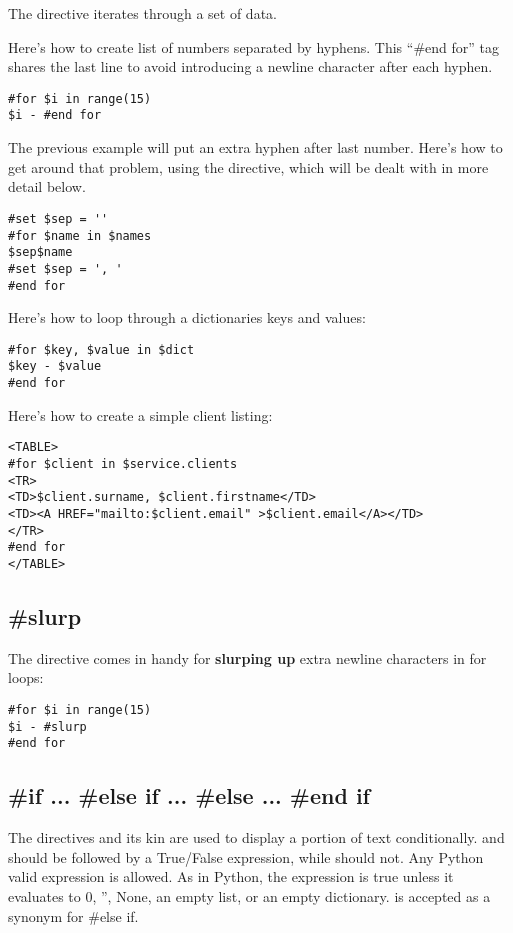 The  directive iterates through a set of data.

Here's how to create list of numbers separated by hyphens. This ``\#end for''
tag shares the last line to avoid introducing a newline character after each
hyphen.  
\begin{verbatim}
#for $i in range(15)
$i - #end for
\end{verbatim}

The previous example will put an extra hyphen after last number.  Here's how to
get around that problem, using the  directive, which will be dealt
with in more detail below.
\begin{verbatim}
#set $sep = '' 
#for $name in $names 
$sep$name 
#set $sep = ', ' 
#end for 
\end{verbatim}

Here's how to loop through a dictionaries keys and values:
\begin{verbatim}
#for $key, $value in $dict
$key - $value
#end for
\end{verbatim}

Here's how to create a simple client listing:
\begin{verbatim}
<TABLE>
#for $client in $service.clients
<TR>
<TD>$client.surname, $client.firstname</TD>
<TD><A HREF="mailto:$client.email" >$client.email</A></TD>
</TR>
#end for
</TABLE>
\end{verbatim}


\subsection{\#slurp}
\label{directives.slurp}

The  directive comes in handy for {\bf slurping up} extra newline
characters in for loops:
\begin{verbatim}
#for $i in range(15)
$i - #slurp
#end for
\end{verbatim}

\subsection{\#if ... \#else if ... \#else ... \#end if}
\label{directives.if}

The  directives and its kin are used to display a portion of text
conditionally.  and  should be followed by a
True/False expression, while  should not.  Any Python valid
expression is allowed.  As in Python, the expression is true unless it evaluates
to 0, '', None, an empty list, or an empty dictionary.  is accepted
as a synonym for {\#else if}.

